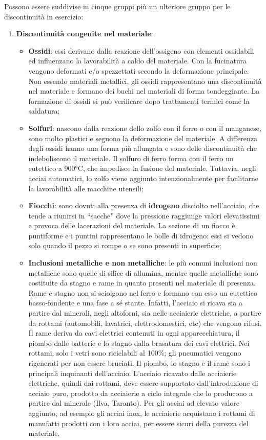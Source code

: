 Possono essere suddivise in cinque gruppi più un ulteriore gruppo per le discontinuità in esercizio:
\begin{enumerate}
    \item \textbf{Discontinuità congenite nel materiale}:
    \begin{itemize}
        \item \textbf{Ossidi}: essi derivano dalla reazione dell’ossigeno con elementi ossidabili ed influenzano la lavorabilità a caldo del materiale. Con la fucinatura vengono deformati e/o spezzettati secondo la deformazione principale. Non essendo materiali metallici, gli ossidi rappresentano una discontinuità nel materiale e formano dei buchi nel materiali di forma tondeggiante. La formazione di ossidi si può verificare dopo trattamenti termici come la saldatura;
        \item \textbf{Solfuri}: nascono dalla reazione dello zolfo con il ferro o con il manganese, sono molto plastici e seguono la deformazione del materiale. A differenza degli ossidi hanno una forma più allungata e sono delle discontinuità che indeboliscono il materiale. Il solfuro di ferro forma con il ferro un eutettico a 900°C, che impedisce la fusione del materiale. Tuttavia, negli acciai automatici, lo zolfo viene aggiunto intenzionalmente per facilitarne la lavorabilità alle macchine utensili;
        \item \textbf{Fiocchi}: sono dovuti alla presenza di \textbf{idrogeno} disciolto nell’acciaio, che tende a riunirsi in “sacche” dove la pressione raggiunge valori elevatissimi e provoca delle lacerazioni del materiale. La sezione di un fiocco è puntiforme e i puntini rappresentano le bolle di idrogeno: essi si vedono solo quando il pezzo si rompe o se sono presenti in superficie;
        \item \textbf{Inclusioni metalliche e non metalliche}: le più comuni inclusioni non metalliche sono quelle di silice di allumina, mentre quelle metalliche sono costituite da stagno e rame in quanto presenti nel materiale di presenza. Rame e stagno non si sciolgono nel ferro e formano con esso un eutettico basso-fondente e una fase a sé stante. Infatti, l’acciaio si ricava sia a partire dal minerali, negli altoforni, sia nelle acciaierie elettriche, a partire da rottami (automobili, lavatrici, elettrodomestici, etc) che vengono rifusi. Il rame deriva da cavi elettrici contenuti in ogni apparecchiatura, il piombo dalle batterie e lo stagno dalla brasatura dei cavi elettrici. Nei rottami, solo i vetri sono riciclabili al 100\%; gli pneumatici vengono rigenerati per non essere bruciati. Il piombo, lo stagno e il rame sono i principali inquinanti dell’acciaio. L’acciaio ricavato dalle acciaierie elettriche, quindi dai rottami, deve essere supportato dall’introduzione di acciaio puro, prodotto da acciaierie a ciclo integrale che lo producono a partire dal minerale (Ilva, Taranto). Per gli acciai ad elevato valore aggiunto, ad esempio gli acciai inox, le acciaierie acquistano i rottami di manufatti prodotti con i loro acciai, per essere sicuri della purezza del materiale.

\end{itemize}
\end{enumerate}
